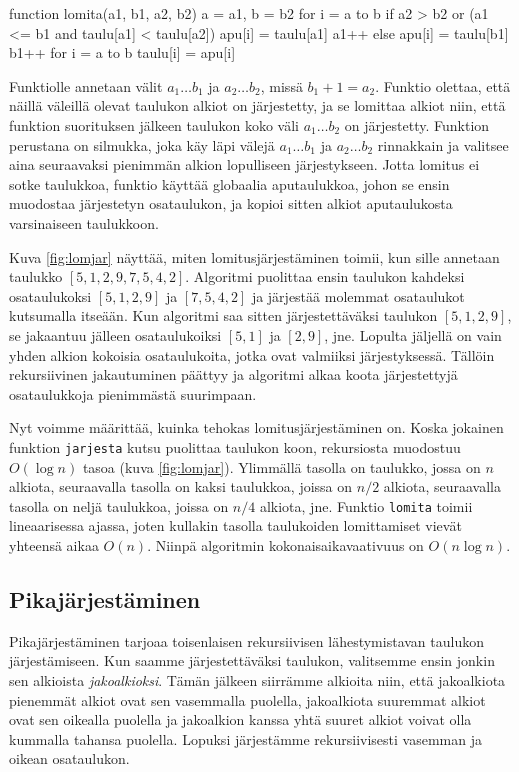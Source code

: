 \begin{code}
function lomita(a1, b1, a2, b2)
    a = a1, b = b2
    for i = a to b
        if a2 > b2 or (a1 <= b1 and taulu[a1] < taulu[a2])
            apu[i] = taulu[a1]
            a1++
        else
            apu[i] = taulu[b1]
            b1++
    for i = a to b
        taulu[i] = apu[i]
\end{code}

Funktiolle annetaan välit $a_1 \dots b_1$ ja $a_2 \dots b_2$,
missä $b_1+1=a_2$.
Funktio olettaa, että näillä väleillä olevat 
taulukon alkiot on järjestetty,
ja se lomittaa alkiot niin, että funktion suorituksen jälkeen
taulukon koko väli $a_1 \dots b_2$ on järjestetty.
Funktion perustana on silmukka, joka käy läpi välejä
$a_1 \dots b_1$ ja $a_2 \dots b_2$ rinnakkain ja valitsee
aina seuraavaksi pienimmän alkion lopulliseen järjestykseen.
Jotta lomitus ei sotke taulukkoa,
funktio käyttää globaalia aputaulukkoa,
johon se ensin muodostaa järjestetyn osataulukon,
ja kopioi sitten alkiot aputaulukosta varsinaiseen taulukkoon.

Kuva \ref{fig:lomjar} näyttää, miten lomitusjärjestäminen
toimii, kun sille annetaan taulukko $[5,1,2,9,7,5,4,2]$.
Algoritmi puolittaa ensin taulukon kahdeksi osataulukoksi
$[5,1,2,9]$ ja $[7,5,4,2]$ ja järjestää molemmat
osataulukot kutsumalla itseään.
Kun algoritmi saa sitten järjestettäväksi taulukon $[5,1,2,9]$,
se jakaantuu jälleen osataulukoiksi $[5,1]$ ja $[2,9]$, jne.
Lopulta jäljellä on vain yhden alkion kokoisia
osataulukoita, jotka ovat valmiiksi järjestyksessä.
Tällöin rekursiivinen jakautuminen päättyy ja algoritmi
alkaa koota järjestettyjä osataulukkoja pienimmästä suurimpaan.

Nyt voimme määrittää, kuinka tehokas lomitusjärjestäminen on.
Koska jokainen funktion \texttt{jarjesta} kutsu
puolittaa taulukon koon, rekursiosta muodostuu
$O(\log n)$ tasoa  (kuva \ref{fig:lomjar}).
Ylimmällä tasolla on taulukko,
jossa on $n$ alkiota,
seuraavalla tasolla on kaksi taulukkoa,
joissa on $n/2$ alkiota,
seuraavalla tasolla on neljä taulukkoa,
joissa on $n/4$ alkiota, jne.
Funktio \texttt{lomita} toimii lineaarisessa ajassa,
joten kullakin tasolla taulukoiden lomittamiset vievät yhteensä
aikaa $O(n)$.
Niinpä algoritmin kokonaisaikavaativuus on $O(n \log n)$.

\subsection{Pikajärjestäminen}

Pikajärjestäminen tarjoaa toisenlaisen rekursiivisen
lähestymistavan taulukon järjestämiseen.
Kun saamme järjestettäväksi taulukon, valitsemme ensin jonkin
sen alkioista \emph{jakoalkioksi}.
Tämän jälkeen siirrämme alkioita niin,
että jakoalkiota pienemmät alkiot ovat sen vasemmalla puolella,
jakoalkiota suuremmat alkiot ovat sen oikealla puolella ja
jakoalkion kanssa yhtä suuret alkiot voivat olla kummalla tahansa puolella.
Lopuksi järjestämme rekursiivisesti vasemman ja oikean osataulukon.

